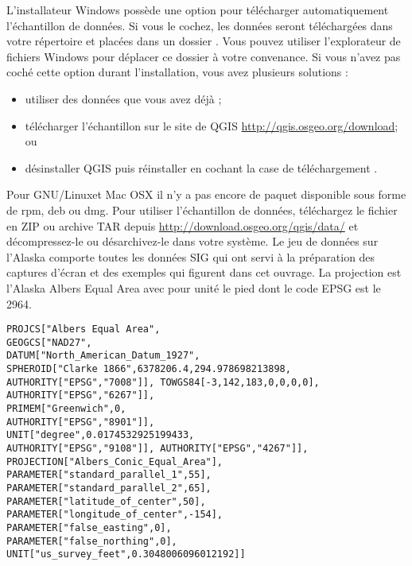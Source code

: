 \win L'installateur Windows possède une option pour télécharger automatiquement l'échantillon de données. Si vous le cochez, les données seront téléchargées dans votre répertoire  et placées dans un dossier . Vous pouvez utiliser l'explorateur de fichiers Windows pour déplacer ce dossier à votre convenance. Si vous n'avez pas coché cette option durant l'installation, vous avez plusieurs solutions : 
\begin{itemize} 
\item utiliser des données que vous avez déjà ;
\item télécharger l'échantillon sur le site de QGIS \url{http://qgis.osgeo.org/download}; ou 
\item désinstaller QGIS puis réinstaller en cochant la case de téléchargement .
\end{itemize}

\nix \osx Pour GNU/Linuxet Mac OSX il n'y a pas encore de paquet disponible sous forme de rpm, deb ou dmg. Pour utiliser l'échantillon de données, téléchargez le fichier  en ZIP ou archive TAR depuis \url{http://download.osgeo.org/qgis/data/} et décompressez-le ou désarchivez-le dans votre système. Le jeu de données sur l'Alaska comporte toutes les données SIG qui ont servi à la préparation des captures d'écran et des exemples qui figurent dans cet ouvrage. La projection est l'Alaska Albers Equal Area avec pour unité le pied dont le code EPSG est le 2964.

\begin{verbatim}
PROJCS["Albers Equal Area",  
GEOGCS["NAD27",  
DATUM["North_American_Datum_1927",  
SPHEROID["Clarke 1866",6378206.4,294.978698213898,  
AUTHORITY["EPSG","7008"]], TOWGS84[-3,142,183,0,0,0,0], AUTHORITY["EPSG","6267"]],   
PRIMEM["Greenwich",0,   
AUTHORITY["EPSG","8901"]],   
UNIT["degree",0.0174532925199433,   
AUTHORITY["EPSG","9108"]], AUTHORITY["EPSG","4267"]],   
PROJECTION["Albers_Conic_Equal_Area"],   
PARAMETER["standard_parallel_1",55],   
PARAMETER["standard_parallel_2",65],   
PARAMETER["latitude_of_center",50],   
PARAMETER["longitude_of_center",-154],   
PARAMETER["false_easting",0],   
PARAMETER["false_northing",0],   
UNIT["us_survey_feet",0.3048006096012192]] \end{verbatim}


